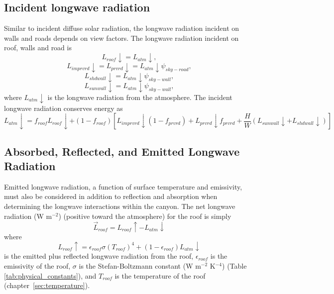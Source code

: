 \documentclass[12pt,authoryear]{elsarticle}
\numberwithin{equation}{section} %
\begin{document}
\subsection{Incident longwave radiation}
\label{sec:incident_longwave_radiation}
%
Similar to incident diffuse solar radiation, the longwave radiation incident on walls and roads depends on view factors. The longwave radiation incident on roof, walls and road is
\begin{equation}
L_{roof}\downarrow=L_{atm}\downarrow,
\end{equation}
\begin{equation}
L_{imprvrd}\downarrow = L_{prvrd}\downarrow = L_{atm}\downarrow\psi_{sky-road},
\end{equation}
\begin{equation}
L_{shdwall}\downarrow = L_{atm}\downarrow\psi_{sky-wall},
\end{equation}
\begin{equation}
L_{sunwall}\downarrow = L_{atm}\downarrow\psi_{sky-wall},
\end{equation}
where $L_{atm}\downarrow$ is the longwave radiation from the atmosphere. The incident longwave radiation conserves energy as
\begin{equation}
L_{atm}\downarrow = f_{roof}L_{roof}\downarrow+(1-f_{roof})\left[L_{imprvrd}\downarrow(1-f_{prvrd})+L_{prvrd}\downarrow f_{prvrd}+\frac{H}{W}(L_{sunwall}\downarrow+L_{shdwall}\downarrow)\right]
\end{equation}

\subsection{Absorbed, Reflected, and Emitted Longwave Radiation}
\label{sec:absorbed_reflected_emitted_longwave_radiation}
%
Emitted longwave radiation, a function of surface temperature and emissivity, must also be considered in addition to reflection and absorption when determining the longwave interactions within the canyon. The net longwave radiation (W m$^{-2}$) (positive toward the atmosphere) for the roof is simply
\begin{equation}
\overrightarrow{L}_{roof}=L_{roof}\uparrow -L_{atm}\downarrow
\end{equation}
where 
\begin{equation}
L_{roof}\uparrow  = \epsilon_{roof} \sigma(T_{roof})^4+(1-\epsilon_{roof})L_{atm}\downarrow
\end{equation}
is the emitted plus reflected longwave radiation from the roof, $\epsilon_{roof}$ is the emissivity of the roof, $\sigma$ is the Stefan-Boltzmann constant (W m$^{-2}$ K$^{-4}$) (Table \ref{tab:physical_constants}), and $T_{roof}$ is the
temperature of the roof (chapter~\ref{sec:temperature}).
\end{document}
